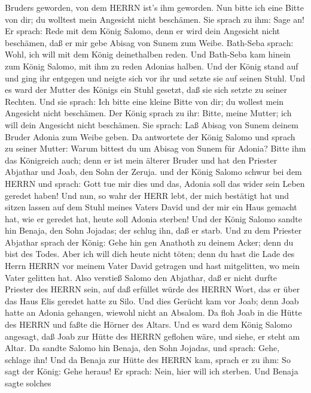 Bruders geworden, von dem HERRN ist's ihm geworden.  Nun
bitte ich eine Bitte von dir; du wolltest mein Angesicht nicht
beschämen. Sie sprach zu ihm: Sage an!  Er sprach: Rede mit
dem König Salomo, denn er wird dein Angesicht nicht beschämen, daß er
mir gebe Abisag von Sunem zum Weibe.  Bath-Seba sprach:
Wohl, ich will mit dem König deinethalben reden.  Und
Bath-Seba kam hinein zum König Salomo, mit ihm zu reden Adonias halben.
Und der König stand auf und ging ihr entgegen und neigte sich vor ihr
und setzte sie auf seinen Stuhl. Und es ward der Mutter des Königs ein
Stuhl gesetzt, daß sie sich setzte zu seiner Rechten.  Und
sie sprach: Ich bitte eine kleine Bitte von dir; du wollest mein
Angesicht nicht beschämen. Der König sprach zu ihr: Bitte, meine Mutter;
ich will dein Angesicht nicht beschämen.  Sie sprach: Laß
Abisag von Sunem deinem Bruder Adonia zum Weibe geben.  Da
antwortete der König Salomo und sprach zu seiner Mutter: Warum bittest
du um Abisag von Sunem für Adonia? Bitte ihm das Königreich auch; denn
er ist mein älterer Bruder und hat den Priester Abjathar und Joab, den
Sohn der Zeruja.  und der König Salomo schwur bei dem HERRN
und sprach: Gott tue mir dies und das, Adonia soll das wider sein Leben
geredet haben!  Und nun, so wahr der HERR lebt, der mich
bestätigt hat und sitzen lassen auf dem Stuhl meines Vaters David und
der mir ein Haus gemacht hat, wie er geredet hat, heute soll Adonia
sterben!  Und der König Salomo sandte hin Benaja, den Sohn
Jojadas; der schlug ihn, daß er starb.  Und zu dem Priester
Abjathar sprach der König: Gehe hin gen Anathoth zu deinem Acker; denn
du bist des Todes. Aber ich will dich heute nicht töten; denn du hast
die Lade des Herrn HERRN vor meinem Vater David getragen und hast
mitgelitten, wo mein Vater gelitten hat.  Also verstieß
Salomo den Abjathar, daß er nicht durfte Priester des HERRN sein, auf
daß erfüllet würde des HERRN Wort, das er über das Haus Elis geredet
hatte zu Silo.  Und dies Gerücht kam vor Joab; denn Joab
hatte an Adonia gehangen, wiewohl nicht an Absalom. Da floh Joab in die
Hütte des HERRN und faßte die Hörner des Altars.  Und es
ward dem König Salomo angesagt, daß Joab zur Hütte des HERRN geflohen
wäre, und siehe, er steht am Altar. Da sandte Salomo hin Benaja, den
Sohn Jojadas, und sprach: Gehe, schlage ihn!  Und da Benaja
zur Hütte des HERRN kam, sprach er zu ihm: So sagt der König: Gehe
heraus! Er sprach: Nein, hier will ich sterben. Und Benaja sagte solches
